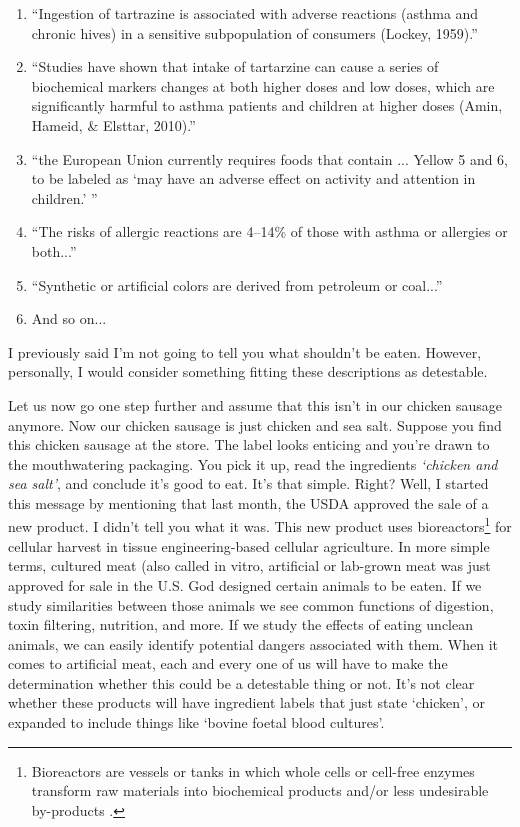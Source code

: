 \documentclass[10pt]{article}
\begin{document}
\begin{multicols}{2}
\begin{enumerate}
	\item ``Ingestion of tartrazine is associated with adverse reactions (asthma and chronic hives) in a sensitive subpopulation of consumers (Lockey, 1959).''
	
	\item ``Studies have shown that intake of tartarzine can cause a series of biochemical markers changes at both higher doses and low doses, which are significantly harmful to asthma patients and children at higher doses (Amin, Hameid, \& Elsttar, 2010).''
	
	\item ``the European Union currently requires foods that contain ... Yellow 5 and 6, to be labeled as `may have an adverse effect on activity and attention in children.' ''
	
	\item ``The risks of allergic reactions are 4–14\% of those with asthma or allergies or both...''
	
	\item ``Synthetic or artificial colors are derived from petroleum or coal...''
	
	\item And so on...
\end{enumerate}

I previously said I'm not going to tell you what shouldn't be eaten. However, personally, I would consider something fitting these descriptions as detestable. 

Let us now go one step further and assume that this isn't in our chicken sausage anymore. Now our chicken sausage is just chicken and sea salt. Suppose you find this chicken sausage at the store. The label looks enticing and you're drawn to the mouthwatering packaging. You pick it up, read the ingredients \textit{`chicken and sea salt'}, and conclude it's good to eat. It's that simple. Right? Well, I started this message by mentioning that last month, the USDA approved the sale of a new product. I didn't tell you what it was. This new product uses bioreactors\footnote{Bioreactors are vessels or tanks in which whole cells or cell-free enzymes transform raw materials into biochemical products and/or less undesirable by-products \cite{bioreactors}.} for cellular harvest in tissue engineering-based cellular agriculture\cite{LabGrownMeatReview}. In more simple terms, cultured meat (also called in vitro, artificial or lab-grown meat was just approved for sale in the U.S. God designed certain animals to be eaten. If we study similarities between those animals we see common functions of digestion, toxin filtering, nutrition, and more. If we study the effects of eating unclean animals, we can easily identify potential dangers associated with them. When it comes to artificial meat, each and every one of us will have to make the determination whether this could be a detestable thing or not. It's not clear whether these products will have ingredient labels that just state `chicken', or expanded to include things like `bovine foetal blood cultures'\cite{LabGrownMeatReview}. 



\end{multicols}
\end{document}
